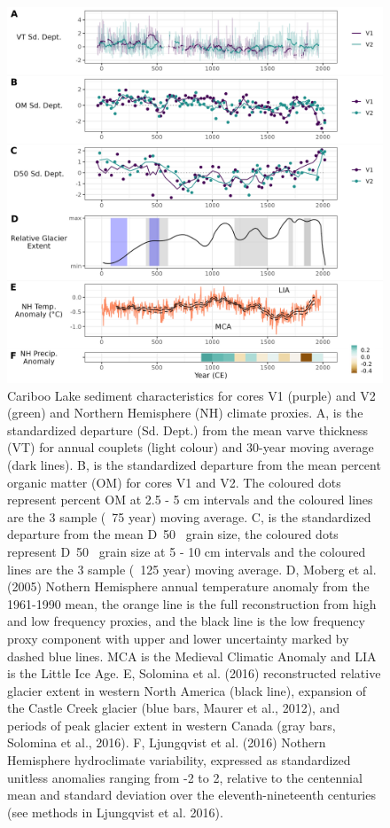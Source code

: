 \documentclass[Royal,times,doublespace,sageh]{sagej}
\begin{document}
\begin{figure}

{\centering \includegraphics[width=1\linewidth]{figs/all_core_stats_2k_anomalies} 

}

\caption{Cariboo Lake sediment characteristics for cores V1 (purple) and V2 (green) and Northern Hemisphere (NH) climate proxies. A, is the standardized departure (Sd. Dept.) from the mean varve thickness (VT) for annual couplets (light colour) and 30-year moving average (dark lines). B, is the standardized departure from the mean percent organic matter (OM) for cores V1 and V2. The coloured dots represent percent OM at 2.5 - 5 cm intervals and the coloured lines are the 3 sample (~75 year) moving average. C, is the standardized departure from the mean D~50~ grain size, the coloured dots represent D~50~ grain size at 5 - 10 cm intervals and the coloured lines are the 3 sample (~125 year) moving average. D, Moberg et al. (2005) Nothern Hemisphere annual temperature anomaly from the 1961-1990 mean, the orange line is the full reconstruction from high and low frequency proxies, and the black line is the low frequency proxy component with upper and lower uncertainty marked by dashed blue lines. MCA is the Medieval Climatic Anomaly and LIA is the Little Ice Age. E, Solomina et al. (2016)  reconstructed relative glacier extent in western North America (black line), expansion of the Castle Creek glacier (blue bars, Maurer et al., 2012), and periods of peak glacier extent in western Canada (gray bars, Solomina et al., 2016). F, Ljungqvist et al. (2016) Nothern Hemisphere hydroclimate variability, expressed as standardized unitless anomalies ranging from -2 to 2, relative to the centennial mean and standard deviation over the eleventh-nineteenth centuries (see methods in Ljungqvist et al. 2016).}\label{fig:proxy-comparison}
\end{figure}
\end{document}
